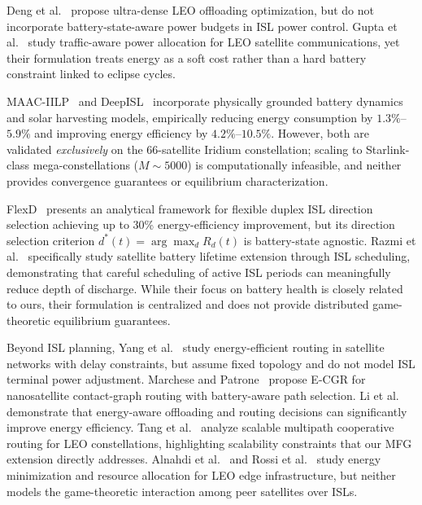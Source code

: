 \documentclass[journal]{IEEEtran}
\begin{document}
Deng et al.~\cite{deng2020ultra} propose ultra-dense LEO offloading optimization, but do not incorporate battery-state-aware power budgets in ISL power control. Gupta et al.~\cite{gupta2025energyefficient} study traffic-aware power allocation for LEO satellite communications, yet their formulation treats energy as a soft cost rather than a hard battery constraint linked to eclipse cycles.

MAAC-IILP~\cite{li2023energy} and DeepISL~\cite{li2023deepisl} incorporate physically grounded battery dynamics and solar harvesting models, empirically reducing energy consumption by $1.3\%$--$5.9\%$ and improving energy efficiency by $4.2\%$--$10.5\%$. However, both are validated \emph{exclusively} on the 66-satellite Iridium constellation; scaling to Starlink-class mega-constellations ($M\!\sim\!5000$) is computationally infeasible, and neither provides convergence guarantees or equilibrium characterization.

FlexD~\cite{lokugama2026flexd} presents an analytical framework for flexible duplex ISL direction selection achieving up to 30\% energy-efficiency improvement, but its direction selection criterion $d^*(t)=\arg\max_d R_d(t)$ is battery-state agnostic. Razmi et al.~\cite{razmi2026battery} specifically study satellite battery lifetime extension through ISL scheduling, demonstrating that careful scheduling of active ISL periods can meaningfully reduce depth of discharge. While their focus on battery health is closely related to ours, their formulation is centralized and does not provide distributed game-theoretic equilibrium guarantees.

Beyond ISL planning, Yang et al.~\cite{yang2016energyrouting} study energy-efficient routing in satellite networks with delay constraints, but assume fixed topology and do not model ISL terminal power adjustment. Marchese and Patrone~\cite{marchese2020ecgr} propose E-CGR for nanosatellite contact-graph routing with battery-aware path selection. Li et al.~\cite{li2020energyeff} demonstrate that energy-aware offloading and routing decisions can significantly improve energy efficiency. Tang et al.~\cite{tang2019multipath} analyze scalable multipath cooperative routing for LEO constellations, highlighting scalability constraints that our MFG extension directly addresses. Alnahdi et al.~\cite{alnahdi2025minimizing} and Rossi et al.~\cite{rossi2025resource} study energy minimization and resource allocation for LEO edge infrastructure, but neither models the game-theoretic interaction among peer satellites over ISLs.
\end{document}
